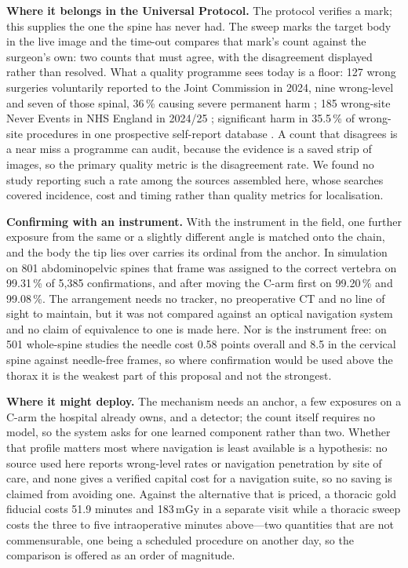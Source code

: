 \documentclass[11pt,letterpaper]{article}
\begin{document}
\textbf{Where it belongs in the Universal Protocol.} The protocol verifies a mark; this supplies the one the
spine has never had. The sweep marks the target body in the live image and the time-out compares that
mark's count against the surgeon's own: two counts that must agree, with the disagreement displayed rather
than resolved. What a quality programme sees today is a floor: 127 wrong surgeries
voluntarily reported to the Joint Commission in 2024, nine wrong-level and seven of those spinal, 36\,\%
causing severe permanent harm \citep{jc2024}; 185 wrong-site Never Events in NHS England in 2024/25
\citep{nhse2025}; significant harm in 35.5\,\% of wrong-site procedures in one prospective self-report
database \citep{stahel2010}. A count that disagrees is a near miss a programme can audit, because the
evidence is a saved strip of images, so the primary quality metric is the disagreement rate. We found no
study reporting such a rate among the sources assembled here, whose searches covered incidence, cost and
timing rather than quality metrics for localisation.

\textbf{Confirming with an instrument.} With the instrument in the field, one further exposure from the same
or a slightly different angle is matched onto the chain, and the body the tip lies over carries its ordinal
from the anchor. In simulation on 801 abdominopelvic spines that frame was assigned to the correct vertebra
on 99.31\,\% of 5{,}385 confirmations, and after moving the C-arm first on 99.20\,\% and 99.08\,\%. The
arrangement needs no tracker, no preoperative CT and no line of sight to maintain, but it was not compared
against an optical navigation system and no claim of equivalence to one is made here. Nor is the instrument
free: on 501 whole-spine studies the needle cost 0.58 points overall and 8.5 in the cervical spine against
needle-free frames, so where confirmation would be used above the thorax it is the weakest part of this
proposal and not the strongest.

\textbf{Where it might deploy.} The mechanism needs an anchor, a few exposures on a C-arm the hospital
already owns, and a detector; the count itself requires no model, so the system asks for one learned
component rather than two. Whether that profile matters most where navigation is least available is a
hypothesis: no source used here reports wrong-level rates or navigation penetration by site of care, and
none gives a verified capital cost for a navigation suite, so no saving is claimed from avoiding one.
Against the alternative that is priced, a thoracic gold fiducial costs 51.9 minutes and 183\,mGy in a
separate visit \citep{siminski2023} while a thoracic sweep costs the three to five intraoperative minutes
above---two quantities that are not commensurable, one being a scheduled procedure on another day, so the
comparison is offered as an order of magnitude.
\end{document}
